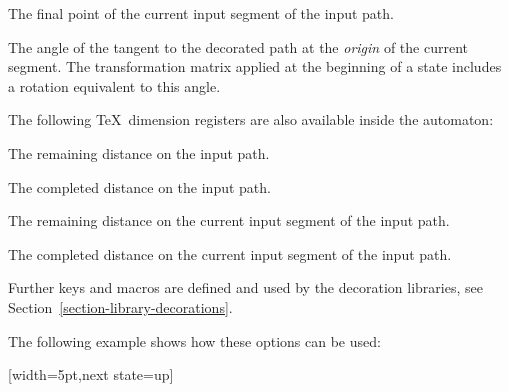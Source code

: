 \begin{command}{\pgfdeclaredecoration{}}
\begin{command}{\state{}}
        \begin{command}{\pgfpointdecoratedinputsegmentlast}
            The final point of the current input segment of the input path.
        \end{command}

        \begin{command}{\pgfdecoratedangle}
            The angle of the tangent to the decorated path at the \emph{origin}
            of the current segment. The transformation matrix applied at the
            beginning of a state includes a rotation equivalent to this angle.
        \end{command}

        The following \TeX\ dimension registers are also available inside the
        automaton:

        \begin{command}{\pgfdecoratedremainingdistance}
            The remaining distance on the input path.
        \end{command}

        \begin{command}{\pgfdecoratedcompleteddistance}
            The completed distance on the input path.
        \end{command}

        \begin{command}{\pgfdecoratedinputsegmentremainingdistance}
            The remaining distance on the current input segment of the input path.
        \end{command}

        \begin{command}{\pgfdecoratedinputsegmentcompleteddistance}
            The completed distance on the current input segment of the input path.
        \end{command}

        Further keys and macros are defined and used by the decoration
        libraries, see Section~\ref{section-library-decorations}.

        The following example shows how these options can be used:
\begin{codeexample}[]
{
  [width=5pt,next state=up]
  { \pgfpathlineto{\pgfpoint{5pt}{0pt}} }

}
\end{codeexample}
\end{command}
\end{command}
